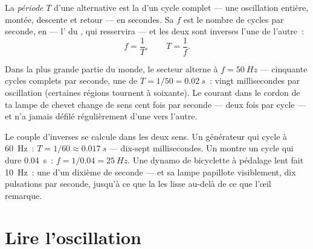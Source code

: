 \begin{definition}\label{def:g9:alternating-current:period}
La \emph{période} $T$ d'une  alternative est la
 d'un cycle complet --- une oscillation entière, montée,
descente et retour --- en secondes. Sa \emph{} $f$ est le
nombre de cycles par seconde, en  --- l' du , qui
resservira --- et les deux sont inverses l'une de l'autre~:
\[
f = \frac{1}{T}, \qquad T = \frac{1}{f}.
\]
\end{definition}

\begin{proposition}\label{prop:g9:alternating-current:mains}
Dans la plus grande partie du monde, le secteur alterne à
$f = \qty{50}{Hz}$ --- cinquante cycles complets par seconde, une
 de $T = 1/50 = \qty{0.02}{s}$~: vingt millisecondes par
oscillation (certaines régions tournent à soixante). Le courant dans
le cordon de ta lampe de chevet change de sens cent fois par seconde
--- deux fois par cycle --- et n'a jamais défilé régulièrement d'une
 vers l'autre.
\end{proposition}

\begin{example}\label{ex:g9:alternating-current:arithmetic}
Le couple d'inverses se calcule dans les deux sens. Un générateur qui
cycle à \qty{60}{Hz}~: $T = 1/60 \approx \qty{0.017}{s}$ --- dix-sept
millisecondes. Un  montre un cycle qui dure
\qty{0.04}{s}~: $f = 1/0.04 = \qty{25}{Hz}$. Une dynamo de bicyclette
à pédalage lent fait \qty{10}{Hz}~: une  d'un dixième de
seconde --- et sa lampe papillote visiblement, dix pulsations par
seconde, jusqu'à ce que la  les lisse au-delà de ce que l'œil
remarque.
\end{example}

\section{Lire l'oscillation}

